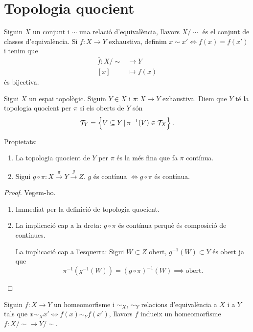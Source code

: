 \section{Topologia quocient}
\begin{obs}
	Siguin $X$ un conjunt i $\sim$ una relació d'equivalència, llavors $X/\sim$ \'es el conjunt de classes d'equivalència. Si $f\colon X\rightarrow Y$ exhaustiva, definim $x\sim x' \iff f(x) = f(x')$ i tenim que
	\begin{align*}
		\overline{f} \colon X/\sim &\rightarrow Y \\
		\left[ x \right] &\mapsto f(x)
	\end{align*}
	\'es bijectiva.
\end{obs}
\begin{defi}
	Sigui $X$ un espai topològic. Siguin $Y\in X$ i $\pi \colon X \rightarrow Y$ exhaustiva. Diem que $Y$ t\'e la topologia quocient per $\pi$ si els oberts de $Y$ són
	\[ \mathcal{T}_Y = \left\{ V\subseteq Y\,|\,\pi^{-1}(V) \in \mathcal{T}_X \right\}. \]
\end{defi}
\begin{prop}
	Propietats:
	\begin{enumerate}
		\item La topologia quocient de $Y$ per $\pi$ \'es la m\'es fina que fa $\pi$ contínua.
		\item Sigui $g\circ\pi \colon X \stackrel{\pi}{\rightarrow} Y \stackrel{g}{\rightarrow} Z$. $g$ \'es contínua $\iff g\circ\pi$ \'es contínua.
	\end{enumerate}
\end{prop}
\begin{proof}
	Vegem-ho.
	\begin{enumerate}
		\item Immediat per la definició de topologia quocient.
		\item La implicació cap a la dreta: $g \circ \pi$ \'es contínua perquè \'es composició de contínues.

			La implicació cap a l'esquerra: Sigui $W \subset Z$ obert, $g^{-1}(W) \subset Y$ \'es obert ja que
			\[\pi^{-1}\left( g^{-1}\left( W \right) \right) = \left( g\circ \pi \right)^{-1}\left( W \right) \implies \text{obert.}\]
	\end{enumerate}
\end{proof}
\begin{prop}
	Siguin $f\colon X\rightarrow Y$ un homeomorfisme i $\sim_X$, $\sim_Y$ relacions d'equivalència a $X$ i a $Y$ tals que $x \sim_X x' \iff f\left( x \right) \sim_Y f\left( x' \right)$, llavors $f$ indueix un homeomorfisme $\overline{f} \colon X/\sim \rightarrow Y/\sim$.
\end{prop}
